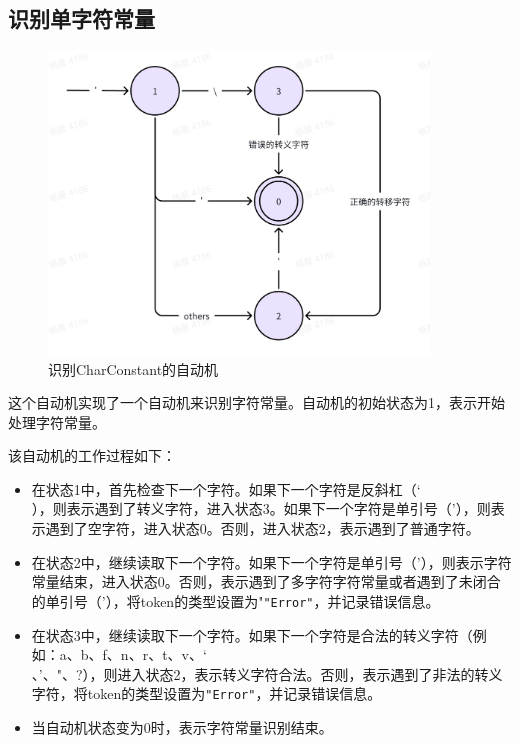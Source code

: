 \documentclass[lang=cn,11pt,a4paper]{elegantpaper}
\begin{document}
\subsection{识别单字符常量}

\begin{figure}[!htb]
    \centering
    \includegraphics[width=0.9\textwidth]{image/Char.png}
    \caption{识别CharConstant的自动机}
\end{figure}

这个自动机实现了一个自动机来识别字符常量。自动机的初始状态为1，表示开始处理字符常量。

该自动机的工作过程如下：
\begin{itemize}
    \item 在状态1中，首先检查下一个字符。如果下一个字符是反斜杠（\char`\\），则表示遇到了转义字符，进入状态3。如果下一个字符是单引号（'），则表示遇到了空字符，进入状态0。否则，进入状态2，表示遇到了普通字符。
    \item 在状态2中，继续读取下一个字符。如果下一个字符是单引号（'），则表示字符常量结束，进入状态0。否则，表示遇到了多字符字符常量或者遇到了未闭合的单引号（'），将token的类型设置为"\lstinline{"Error"}，并记录错误信息。
    \item 在状态3中，继续读取下一个字符。如果下一个字符是合法的转义字符（例如：a、b、f、n、r、t、v、\char`\\、'、"、?），则进入状态2，表示转义字符合法。否则，表示遇到了非法的转义字符，将token的类型设置为\lstinline{"Error"}，并记录错误信息。
    \item 当自动机状态变为0时，表示字符常量识别结束。
\end{itemize}
\end{document}
